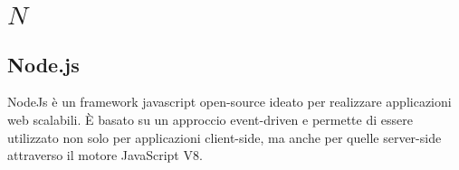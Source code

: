 \section{\quad$N\quad$}
\subsection{Node.js}
NodeJs è un framework javascript open-source ideato per realizzare applicazioni web scalabili. È basato su un approccio event-driven e permette di essere utilizzato non solo per applicazioni client-side, ma anche per quelle server-side attraverso il motore JavaScript V8.


